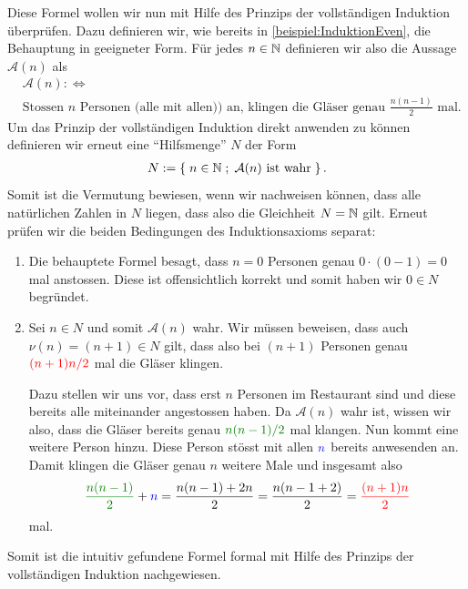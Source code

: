 {
Diese Formel wollen wir nun mit Hilfe des Prinzips der vollständigen Induktion überprüfen. Dazu definieren wir, wie bereits in \cref{beispiel:InduktionEven}, die Behauptung in geeigneter Form. Für jedes $n\in\mathbb{N}$ definieren wir also die Aussage $\mathcal{A}(n)$ als
\begin{align*}
    &\mathcal{A}(n) :\iff \\
    &\text{Stossen $n$ Personen (alle mit allen)) an, klingen die Gläser genau } \frac{n(n-1)}{2} \text{ mal}.
\end{align*}
Um das Prinzip der vollständigen Induktion direkt anwenden zu können definieren wir erneut eine \enquote{Hilfsmenge} $N$ der Form
\begin{align*}
    N := \left\{\;n\in\mathbb{N} \; ; \; \text{$\mathcal{A}(n)$ ist wahr} \;\right\}.
\end{align*}
Somit ist die Vermutung bewiesen, wenn wir nachweisen können, dass alle natürlichen Zahlen in $N$ liegen, dass also die Gleichheit $N=\mathbb{N}$ gilt. Erneut prüfen wir die beiden Bedingungen des Induktionsaxioms separat:
\begin{enumerate}
    \item Die behauptete Formel besagt, dass $n = 0$ Personen genau $0\cdot (0-1) = 0$ mal anstossen. Diese ist offensichtlich korrekt und somit haben wir $0\in N$ begründet. \checkmark
    \item Sei $n\in N$ und somit $\mathcal{A}(n)$ wahr. Wir müssen beweisen, dass auch $\nu(n)=(n+1)\in N$ gilt, dass also bei $(n+1)$ Personen genau $\textcolor{Red}{(n+1)n/2}$ mal die Gläser klingen. 
    
    \noindent
    Dazu stellen wir uns vor, dass erst $n$ Personen im Restaurant sind und diese bereits alle miteinander angestossen haben. Da $\mathcal{A}(n)$ wahr ist, wissen wir also, dass die Gläser bereits genau $\textcolor{Green}{n(n-1)/2}$ mal klangen. Nun kommt eine weitere Person hinzu. Diese Person stösst mit allen $\textcolor{Blue}{n}$ bereits anwesenden an. Damit klingen die Gläser genau $n$ weitere Male und insgesamt also
    \begin{align*}
        \textcolor{Green}{\frac{n(n-1)}{2}} + \textcolor{Blue}{n} = \frac{n(n-1)+2n}{2} = \frac{n(n-1+2)}{2} = \textcolor{Red}{\frac{(n+1)n}{2}}
    \end{align*}
    mal. \checkmark
\end{enumerate}
Somit ist die intuitiv gefundene Formel formal mit Hilfe des Prinzips der vollständigen Induktion nachgewiesen.}

